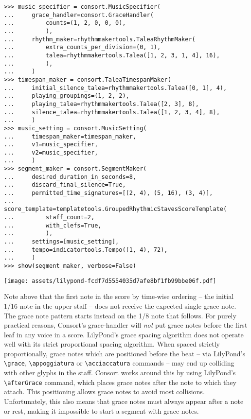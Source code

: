 \begin{abjadbookoutput}
\begin{singlespacing}
\vspace{-0.5\baselineskip}
\begin{lstlisting}
>>> music_specifier = consort.MusicSpecifier(
...     grace_handler=consort.GraceHandler(
...         counts=(1, 2, 0, 0, 0),
...         ),
...     rhythm_maker=rhythmmakertools.TaleaRhythmMaker(
...         extra_counts_per_division=(0, 1),
...         talea=rhythmmakertools.Talea([1, 2, 3, 1, 4], 16),
...         ),
...     )
>>> timespan_maker = consort.TaleaTimespanMaker(
...     initial_silence_talea=rhythmmakertools.Talea([0, 1], 4),
...     playing_groupings=(1, 2, 2),
...     playing_talea=rhythmmakertools.Talea([2, 3], 8),
...     silence_talea=rhythmmakertools.Talea([1, 2, 3, 4], 8),
...     )
>>> music_setting = consort.MusicSetting(
...     timespan_maker=timespan_maker,
...     v1=music_specifier,
...     v2=music_specifier,
...     )
>>> segment_maker = consort.SegmentMaker(
...     desired_duration_in_seconds=8,
...     discard_final_silence=True,
...     permitted_time_signatures=[(2, 4), (5, 16), (3, 4)],
...     score_template=templatetools.GroupedRhythmicStavesScoreTemplate(
...         staff_count=2,
...         with_clefs=True,
...         ),
...     settings=[music_setting],
...     tempo=indicatortools.Tempo((1, 4), 72),
...     )
>>> show(segment_maker, verbose=False)
\end{lstlisting}
\noindent\texttt{[image: assets/lilypond-fcdf7d5554035d7afe8bf1fb99bbe06f.pdf]}
\end{singlespacing}
\end{abjadbookoutput}

\noindent Note above that the first note in the score by time-wise ordering --
the initial 1/16 note in the upper staff -- does not receive the expected
single grace note. The grace note pattern starts instead on the 1/8 note that
follows. For purely practical reasons, Consort's grace-handler will \emph{not}
put grace notes before the first leaf in any voice in a score. LilyPond's grace
spacing algorithm does not operate well with its strict proportional spacing
algorithm. When spaced strictly proportionally, grace notes which are
positioned before the beat -- via LilyPond's \texttt{\textbackslash{}grace},
\texttt{\textbackslash{}appoggiatura} or \texttt{\textbackslash{}acciaccatura}
commands -- may end up colliding with other glyphs in the staff. Consort works
around this by using LilyPond's \texttt{\textbackslash{}afterGrace} command,
which places grace notes after the note to which they attach. This positioning
allows grace notes to avoid most collisions. Unfortunately, this also means
that grace notes must always appear after a note or rest, making it impossible
to start a segment with grace notes.

